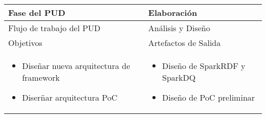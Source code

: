 \vspace{1cm}
\begin{tabular}{|p{}|p{}|}

\hline

\cellcolor[gray]{0.7}Fase del \acs{PUD} & Elaboración
 \\
\hline

\cellcolor[gray]{0.7}Flujo de trabajo del \acs{PUD} & Análisis y Diseño

 \\
\hline


\cellcolor[gray]{0.7}Objetivos  &
\cellcolor[gray]{0.7}Artefactos de Salida \\
\hline

\begin{itemize}
\item Diseñar nueva arquitectura de framework
\item Diserñar arquitectura PoC
\end{itemize}

&

\begin{itemize}
\item Diseño de SparkRDF y SparkDQ
\item Diseño de PoC preliminar
\end{itemize}

 \\
\hline
\end{tabular}


